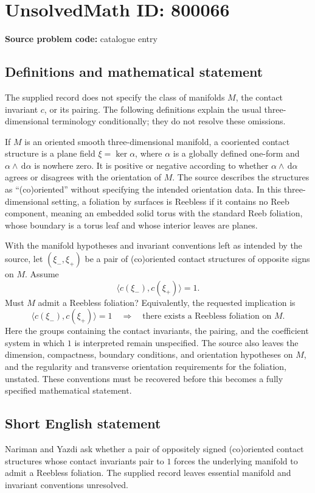 \documentclass[11pt]{article}
\newcommand{\dd}{\,\mathrm{d}}
\begin{document}
\section*{UnsolvedMath ID: 800066}
\textbf{Source problem code:} catalogue entry
\subsection{Definitions and mathematical statement}
The supplied record does not specify the class of manifolds \(M\), the contact invariant \(c\), or its pairing. The following definitions explain the usual three-dimensional terminology conditionally; they do not resolve these omissions.

If \(M\) is an oriented smooth three-dimensional manifold, a cooriented contact structure is a plane field \(\xi=\ker\alpha\), where \(\alpha\) is a globally defined one-form and \(\alpha\wedge\dd\alpha\) is nowhere zero. It is positive or negative according to whether \(\alpha\wedge\dd\alpha\) agrees or disagrees with the orientation of \(M\). The source describes the structures as ``(co)oriented'' without specifying the intended orientation data. In this three-dimensional setting, a foliation by surfaces is Reebless if it contains no Reeb component, meaning an embedded solid torus with the standard Reeb foliation, whose boundary is a torus leaf and whose interior leaves are planes.

With the manifold hypotheses and invariant conventions left as intended by the source, let \((\xi_-,\xi_+)\) be a pair of (co)oriented contact structures of opposite signs on \(M\). Assume
\[
\bigl\langle c(\xi_-),c(\xi_+)\bigr\rangle=1.
\]
Must \(M\) admit a Reebless foliation? Equivalently, the requested implication is
\[
\bigl\langle c(\xi_-),c(\xi_+)\bigr\rangle=1
\quad\Longrightarrow\quad
\text{there exists a Reebless foliation on }M.
\]
Here the groups containing the contact invariants, the pairing, and the coefficient system in which \(1\) is interpreted remain unspecified. The source also leaves the dimension, compactness, boundary conditions, and orientation hypotheses on \(M\), and the regularity and transverse orientation requirements for the foliation, unstated. These conventions must be recovered before this becomes a fully specified mathematical statement.
\subsection{Short English statement}
Nariman and Yazdi ask whether a pair of oppositely signed (co)oriented contact structures whose contact invariants pair to \(1\) forces the underlying manifold to admit a Reebless foliation. The supplied record leaves essential manifold and invariant conventions unresolved.
\end{document}

